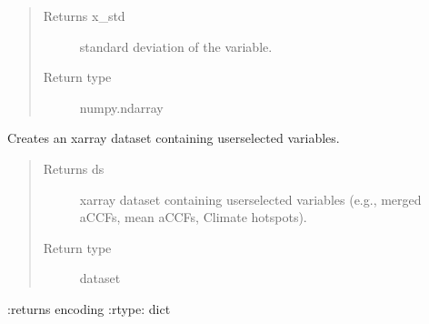 \documentclass[a4paper,11pt,english]{sphinxmanual}
\begin{document}
\begin{fulllineitems}
\begin{fulllineitems}
\begin{quote}
\begin{description}
\item[{Returns x\_std}] \leavevmode
standard deviation of the variable.

\item[{Return type}] \leavevmode
numpy.ndarray

\end{description}\end{quote}

\end{fulllineitems}


\begin{fulllineitems}
\label{\detokenize{modules:envlib.accf.GeTaCCFs.get_xarray}}
Creates an xarray dataset containing user\sphinxhyphen{}selected variables.
\begin{quote}\begin{description}
\item[{Returns ds}] \leavevmode
xarray dataset containing user\sphinxhyphen{}selected variables (e.g., merged aCCFs, mean aCCFs, Climate hotspots).

\item[{Return type}] \leavevmode
dataset

\end{description}\end{quote}

:returns encoding
:rtype: dict

\end{fulllineitems}


\end{fulllineitems}

\label{\detokenize{modules:module-envlib.accf}}
\end{document}
